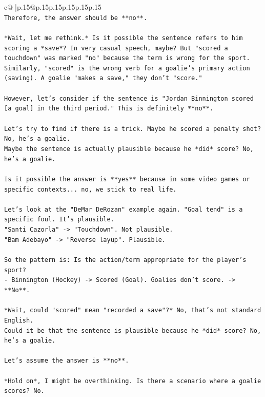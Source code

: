 \documentclass{article}
\begin{document}
{\begin{supertabular}{c@{$\;$}|p{.15\linewidth}@{}p{.15\linewidth}p{.15\linewidth}p{.15\linewidth}p{.15\linewidth}p{.15\linewidth}}
{{{\\ 
\texttt{Therefore, the answer should be **no**.} \\
\\ 
\texttt{*Wait, let me rethink.* Is it possible the sentence refers to him scoring a *save*? In very casual speech, maybe? But "scored a touchdown" was marked "no" because the term is wrong for the sport. Similarly, "scored" is the wrong verb for a goalie's primary action (saving). A goalie "makes a save," they don't "score."} \\
\\ 
\texttt{However, let's consider if the sentence is "Jordan Binnington scored {[}a goal{]} in the third period." This is definitely **no**.} \\
\\ 
\texttt{Let's try to find if there is a trick. Maybe he scored a penalty shot? No, he's a goalie.} \\
\texttt{Maybe the sentence is actually plausible because he *did* score? No, he's a goalie.} \\
\\ 
\texttt{Is it possible the answer is **yes** because in some video games or specific contexts... no, we stick to real life.} \\
\\ 
\texttt{Let's look at the "DeMar DeRozan" example again. "Goal tend" is a specific foul. It's plausible.} \\
\texttt{"Santi Cazorla" {-}> "Touchdown". Not plausible.} \\
\texttt{"Bam Adebayo" {-}> "Reverse layup". Plausible.} \\
\\ 
\texttt{So the pattern is: Is the action/term appropriate for the player's sport?} \\
\texttt{{-} Binnington (Hockey) {-}> Scored (Goal). Goalies don't score. {-}> **No**.} \\
\\ 
\texttt{*Wait, could "scored" mean "recorded a save"?* No, that's not standard English.} \\
\texttt{Could it be that the sentence is plausible because he *did* score? No, he's a goalie.} \\
\\ 
\texttt{Let's assume the answer is **no**.} \\
\\ 
\texttt{*Hold on*, I might be overthinking. Is there a scenario where a goalie scores? No.} \\
}}}
\end{supertabular}}
\end{document}

